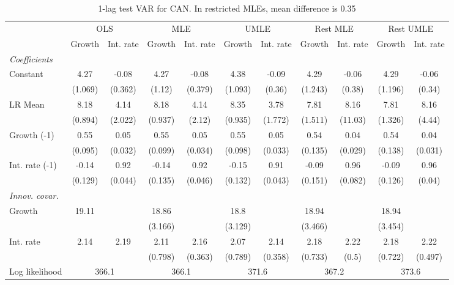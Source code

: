 \begin{table}[htbp] 
	\centering
	\begin{tabular}{@{\extracolsep{4pt}}lcccccccccc@{}}		\hline\hline
		 		 & \multicolumn{2}{c}{OLS} &\multicolumn{2}{c}{MLE} &\multicolumn{2}{c}{UMLE} &\multicolumn{2}{c}{Rest MLE} &\multicolumn{2}{c}{Rest UMLE} \\ 
 		 & Growth 	 & Int. rate 	 & Growth 	 & Int. rate 	 & Growth 	 & Int. rate 	 & Growth 	 & Int. rate 	 & Growth 	 & Int. rate\\\cline{2-3}\cline{4-5}\cline{6-7}\cline{8-9}\cline{10-11}
\rule{0pt}{4ex} 
 \emph{Coefficients} 	  		 & 		 & 		 & 		 & 		 & 		 & 		 & 		 & 		 & 		 &\\ 
\quad Constant 	 & 4.27 	 & -0.08 	 & 4.27 	 & -0.08 	 & 4.38 	 & -0.09 	 & 4.29 	 & -0.06 	 & 4.29 	 & -0.06	 \\ 
 		 & (1.069) 	 & (0.362) 	 & (1.12) 	 & (0.379) 	 & (1.093) 	 & (0.36) 	 & (1.243) 	 & (0.38) 	 & (1.196) 	 & (0.34) 	 \\ 
\quad LR Mean 	 & 8.18 	 & 4.14 	 & 8.18 	 & 4.14 	 & 8.35 	 & 3.78 	 & 7.81 	 & 8.16 	 & 7.81 	 & 8.16	 \\ 
 		 & (0.894) 	 & (2.022) 	 & (0.937) 	 & (2.12) 	 & (0.935) 	 & (1.772) 	 & (1.511) 	 & (11.03) 	 & (1.326) 	 & (4.44) 	 \\ 
\quad Growth (-1) 	 &0.55 	 & 0.05 	 & 0.55 	 & 0.05 	 & 0.55 	 & 0.05 	 & 0.54 	 & 0.04 	 & 0.54 	 & 0.04	 \\ 
 		 & (0.095) 	 & (0.032) 	 & (0.099) 	 & (0.034) 	 & (0.098) 	 & (0.033) 	 & (0.135) 	 & (0.029) 	 & (0.138) 	 & (0.031) 	 \\ 
\quad Int. rate (-1) 	 &-0.14 	 & 0.92 	 & -0.14 	 & 0.92 	 & -0.15 	 & 0.91 	 & -0.09 	 & 0.96 	 & -0.09 	 & 0.96	 \\ 
 		 & (0.129) 	 & (0.044) 	 & (0.135) 	 & (0.046) 	 & (0.132) 	 & (0.043) 	 & (0.151) 	 & (0.082) 	 & (0.126) 	 & (0.04) 	 \\ 
\rule{0pt}{4ex} \emph{Innov. covar.}  	 & 	 & 	 & 	 & 	 & 	 & 	 & 	 & 	 & 	 &\\ 
\quad Growth 	 &19.11 	 &  	 & 18.86 	 &  	 & 18.8 	 &  	 & 18.94 	 &  	 & 18.94 	 & 	 \\ 
 		 &  	 &  	 & (3.166) 	 &  	 & (3.129) 	 &  	 & (3.466) 	 &  	 & (3.454) 	 &  	 \\ 
\quad Int. rate 	 &2.14 	 & 2.19 	 & 2.11 	 & 2.16 	 & 2.07 	 & 2.14 	 & 2.18 	 & 2.22 	 & 2.18 	 & 2.22	 \\ 
 		 &  	 &  	 & (0.798) 	 & (0.363) 	 & (0.789) 	 & (0.358) 	 & (0.733) 	 & (0.5) 	 & (0.722) 	 & (0.497) 	 \\ 
 \hline \rule{0pt}{4ex} 
  Log likelihood 	 &\multicolumn{2}{c}{366.1} 	 & \multicolumn{2}{c}{366.1} 	 & \multicolumn{2}{c}{371.6} 	 & \multicolumn{2}{c}{367.2} 	 & \multicolumn{2}{c}{373.6}\\ 

 \hline 	\end{tabular}		\caption{1-lag test VAR for CAN. In restricted MLEs, mean difference is 0.35}
		\label{tab:CAN1}

\end{table}